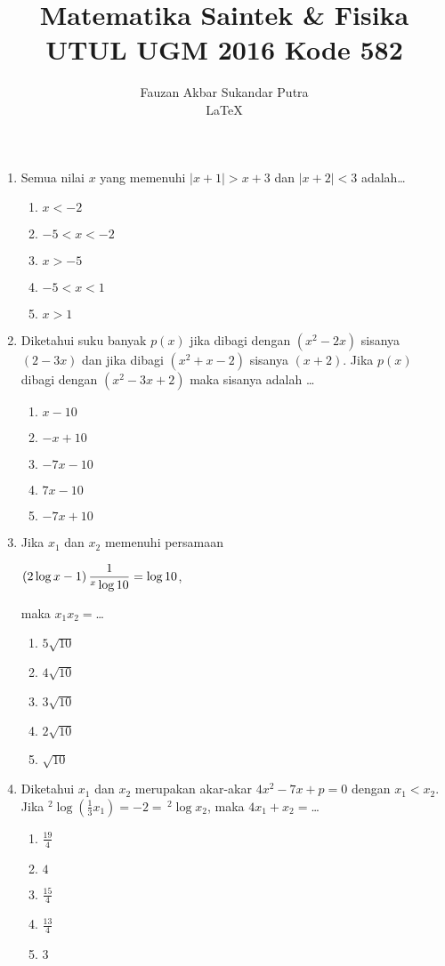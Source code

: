 \documentclass[A4,12PT, english, twocolumn]{journal}
\title{Matematika Saintek \& Fisika UTUL UGM 2016 Kode 582}
\author{Fauzan Akbar Sukandar Putra \\ \LaTeX}
\begin{document}
\maketitle

\begin{enumerate}
\item Semua nilai $x$ yang memenuhi $|x+1| > x+3$ dan $|x+2| < 3$ adalah\dots
    \begin{enumerate}
        \item $x < -2$
        \item $-5 < x < -2$
        \item $x > -5$
        \item $-5 < x < 1$
        \item $x > 1$
    \end{enumerate}

\item Diketahui suku banyak $p(x)$ jika dibagi dengan $(x^2-2x)$ sisanya $(2-3x)$ dan jika dibagi $(x^2+x-2)$ sisanya $(x+2)$. Jika $p(x)$ dibagi dengan $(x^2-3x+2)$ maka sisanya adalah \dots
    \begin{enumerate}
        \item $x-10$
        \item $-x+10$
        \item $-7x-10$
        \item $7x-10$
        \item $-7x+10$
    \end{enumerate}

\item Jika $x_1$ dan $x_2$ memenuhi persamaan 
\begin{center}
    $\left( 2 \log{x-1} \right) \dfrac{1}{^x\log{10}} = \Log{10}$,
\end{center}
maka $x_1x_2 =$\dots
    \begin{enumerate}
        \item $5\sqrt{10}$
        \item $4\sqrt{10}$
        \item $3\sqrt{10}$
        \item $2\sqrt{10}$
        \item $\sqrt{10}$
    \end{enumerate}

\item Diketahui $x_1$ dan $x_2$ merupakan akar-akar $4x^2-7x+p=0$ dengan $x_1<x_2$. Jika $^2\log{\left( \frac{1}{3}x_1 \right)} = -2= \, ^2\log{x_2}$, maka $4x_1+x_2=$\dots
    \begin{enumerate}
        \item $\frac{19}{4}$
        \item $4$
        \item $\frac{15}{4}$
        \item $\frac{13}{4}$
        \item $3$
    \end{enumerate}


\end{enumerate}
\end{document}
